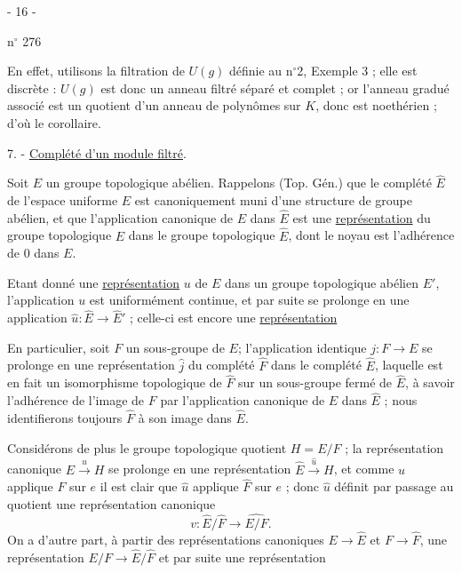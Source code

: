 \begin{center}- 16 -\end{center}
\hfill n$^\circ$ 276

En effet, utilisons la filtration de $U(g)$ définie au n$^\circ$2, Exemple 3 ; elle est discrète : $U(g)$ est donc un anneau filtré séparé et complet ; or l'anneau gradué associé est un quotient d'un anneau de polynômes sur $K$, donc est noethérien ; d'où le corollaire.

7. - \uline{Complété d'un module filtré}.

Soit $E$ un groupe topologique abélien. Rappelons (Top. Gén.) que le complété $\hat E$ de l'espace uniforme $E$ est canoniquement muni d'une structure de groupe abélien, et que l'application canonique de $E$ dans $\hat E$ est une \uline{représentation} du groupe topologique $E$ dans le groupe topologique $\hat E$, dont le noyau est l'adhérence de 0 dans $E$.

Etant donné une \uline{représentation} $u$ de $E$ dans un groupe topologique abélien $E'$, l'application $u$ est uniformément continue, et par suite se prolonge en une application $\hat u:\hat E\longrightarrow\hat E'$ ; celle-ci est encore une \uline{représentation}

En particulier, soit $F$ un sous-groupe de $E$; l'application identique $j:F\longrightarrow E$ se prolonge en une représentation $\hat j$ du complété $\hat F$ dans le complété $\hat E$, laquelle est en fait un isomorphisme topologique de $\hat F$ sur un sous-groupe fermé de $\hat E$, à savoir l'adhérence de l'image de $F$ par l'application canonique de $E$ dans $\hat E$ ; nous identifierons toujours $\hat F$ à son image dans $\hat E$.

Considérons de plus le groupe topologique quotient $H=E/F$ ; la représentation canonique $E\xrightarrow{u}H$ se prolonge en une représentation $\hat E\xrightarrow{\hat u}H$, et comme $u$ applique $F$ sur $e$ il est clair que $\hat u$ applique $\hat F$ sur $e$ ; donc $\hat u$ définit par passage au quotient une représentation canonique
\[
v:\hat E/\hat F\longrightarrow\widehat{E/F}.
\]
On a d'autre part, à partir des représentations canoniques $E\to\hat E$ et $F\longrightarrow\hat F$, une représentation $E/F\to\hat E/\hat F$ et par suite une représentation
